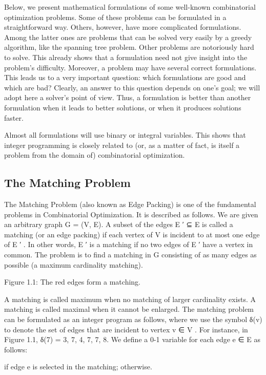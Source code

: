 \documentclass[titlepage]{book}
\begin{document}
Below, we present mathematical formulations of some well-known combinatorial optimization problems.
Some of these problems can be formulated in a straightforward way. Others, however, have more complicated formulations. Among the latter ones are problems that can be solved very easily by a greedy
algorithm, like the spanning tree problem. Other problems are notoriously hard to solve. This already
shows that a formulation need not give insight into the problem's difficulty. Moreover, a problem may
have several correct formulations. This leads us to a very important question: which formulations are
good and which are bad? Clearly, an answer to this question depends on one's goal; we will adopt here
a solver's point of view. Thus, a formulation is better than another formulation when it leads to better
solutions, or when it produces solutions faster.

Almost all formulations will use binary or integral variables. This shows that integer programming
is closely related to (or, as a matter of fact, is itself a problem from the domain of) combinatorial
optimization.

\subsection{The Matching Problem}

The Matching Problem (also known as Edge Packing) is one of the fundamental problems in Combinatorial
Optimization. It is described as follows. We are given an arbitrary graph G = (V, E). A subset of the
edges E ′ ⊆ E is called a matching (or an edge packing) if each vertex of V is incident to at most one edge
of E ′ . In other words, E ′ is a matching if no two edges of E ′ have a vertex in common. The problem is
to find a matching in G consisting of as many edges as possible (a maximum cardinality matching).

Figure 1.1: The red edges form a matching.

A matching is called maximum when no matching of larger cardinality exists. A matching is called
maximal when it cannot be enlarged.
The matching problem can be formulated as an integer program as follows, where we use the symbol
δ(v) to denote the set of edges that are incident to vertex v ∈ V . For instance, in Figure 1.1, δ(7) =
{{3, 7}, {4, 7}, {7, 8}}. We define a 0-1 variable for each edge e ∈ E as follows:


if edge e is selected in the matching;
otherwise.
\end{document}
